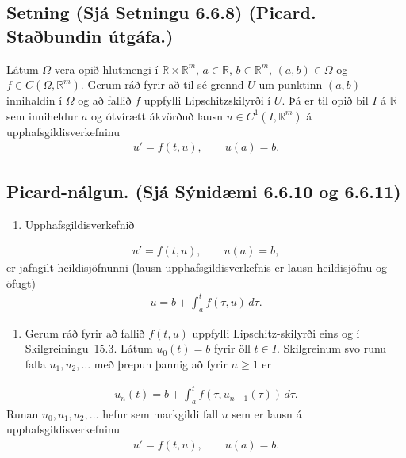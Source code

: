 \documentclass[a4paper,10pt,icelandic]{sphinxmanual}
\begin{document}
\subsection{Setning (Sjá Setningu 6.6.8) (Picard. Staðbundin útgáfa.)}
\label{\detokenize{Kafli06:setning-sja-setningu-6-6-8-picard-stabundin-utgafa}}
Látum \(\Omega\) vera opið hlutmengi í \(\mathbb{R}\times \mathbb{R}^{m}\), \(a\in \mathbb{R}\), \(b\in \mathbb{R}^m\), \((a,b)\in \Omega\) og \(f\in C(\Omega,\mathbb{R}^m)\). Gerum ráð fyrir að til sé grennd \(U\) um punktinn \((a,b)\) innihaldin í \(\Omega\) og að fallið \(f\) uppfylli Lipschitz\textendash{}skilyrði í \(U\). Þá er til opið bil \(I\) á \(\mathbb{R}\) sem inniheldur \(a\) og ótvírætt ákvörðuð lausn \(u\in C^1(I, \mathbb{R}^m)\) á upphafsgildisverkefninu
\begin{equation*}
\begin{split}u'=f(t,u), \qquad u(a)=b.\end{split}
\end{equation*}

\subsection{Picard-nálgun. (Sjá Sýnidæmi 6.6.10 og 6.6.11)}
\label{\detokenize{Kafli06:picard-nalgun-sja-synidaemi-6-6-10-og-6-6-11}}\begin{enumerate}
%
\item {} 
Upphafsgildisverkefnið

\end{enumerate}
\begin{equation*}
\begin{split}u'=f(t,u),\qquad u(a)=b,\end{split}
\end{equation*}
er jafngilt heildisjöfnunni (lausn upphafsgildisverkefnis er lausn heildisjöfnu og öfugt)
\begin{equation*}
\begin{split}u=b+\int_a^t f(\tau,u)\,d\tau.\end{split}
\end{equation*}\begin{enumerate}
%
\setcounter{enumi}{1}
\item {} 
Gerum ráð fyrir að fallið \(f(t,u)\) uppfylli Lipschitz-skilyrði eins og í Skilgreiningu 15.3. Látum \(u_0(t)=b\) fyrir öll \(t\in I\). Skilgreinum svo runu falla \(u_1, u_2, \ldots\) með þrepun þannig að fyrir \(n\geq 1\) er

\end{enumerate}
\begin{equation*}
\begin{split}u_n(t)=b+\int_a^t f(\tau, u_{n-1}(\tau))\,d\tau.\end{split}
\end{equation*}
Runan \(u_0, u_1, u_2, \ldots\) hefur sem markgildi fall \(u\) sem er lausn á upphafsgildisverkefninu
\begin{equation*}
\begin{split}u'=f(t,u),\qquad u(a)=b.\end{split}
\end{equation*}
\end{document}

